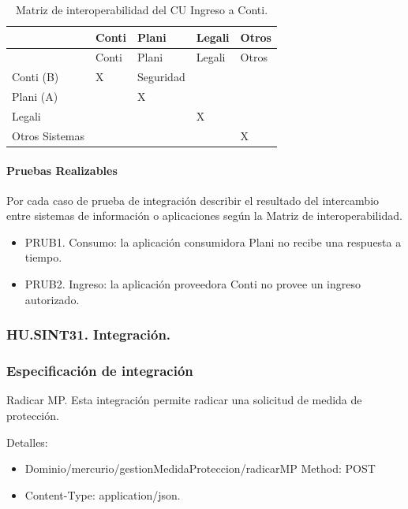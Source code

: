 \documentclass[
  paper=a4,
  ,captions=tableheading
]{scrartcl}
\providecommand{\tightlist}{%
  \setlength{\itemsep}{0pt}\setlength{\parskip}{0pt}}
\begin{document}
\begin{longtable}[]{@{}lllll@{}}
\caption{Matriz de interoperabilidad del CU Ingreso a
Conti.}\tabularnewline
\toprule\noalign{}
& Conti & Plani & Legali & Otros \\
\midrule\noalign{}
\endfirsthead
\toprule\noalign{}
& Conti & Plani & Legali & Otros \\
\midrule\noalign{}
\endhead
\bottomrule\noalign{}
\endlastfoot
Conti (B) & X & Seguridad & & \\
Plani (A) & & X & & \\
Legali & & & X & \\
Otros Sistemas & & & & X \\
\end{longtable}

\paragraph{Pruebas Realizables}\label{sec:pruebas-realizables-2}

Por cada caso de prueba de integración describir el resultado del
intercambio entre sistemas de información o aplicaciones según la Matriz
de interoperabilidad.

\begin{itemize}
\tightlist
\item
  PRUB1. Consumo: la aplicación consumidora Plani no recibe una
  respuesta a tiempo.
\item
  PRUB2. Ingreso: la aplicación proveedora Conti no provee un ingreso
  autorizado.
\end{itemize}

\subsubsection{HU.SINT31.
Integración.}\label{sec:hu.sint31.-integraciuxf3n.}

\subsubsection{Especificación de
integración}\label{sec:especificaciuxf3n-de-integraciuxf3n-3}

Radicar MP. Esta integración permite radicar una solicitud de medida de
protección.

Detalles:

\begin{itemize}
\tightlist
\item
  Dominio/mercurio/gestionMedidaProteccion/radicarMP Method: POST
\item
  Content-Type: application/json.
\end{itemize}
\end{document}
